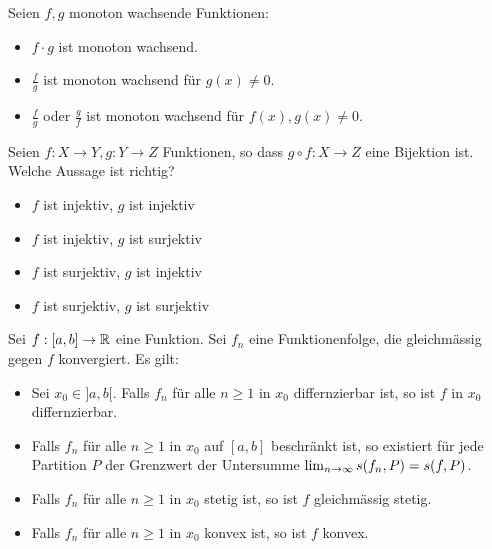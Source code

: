 Seien $f,g$ monoton wachsende Funktionen:
\begin{itemize}
    \item[$\square$]
    $f \cdot g$ ist monoton wachsend. 
    \item[$\square$]
    $\frac{f}{g}$ ist monoton wachsend für $g(x) \neq 0$.
    \item[$\square$]
    $\frac{f}{g}$ oder $\frac{g}{f}$ ist monoton wachsend für $f(x), g(x) \neq 0$.
\end{itemize}

Seien $f : X \to Y, g : Y \to Z$ Funktionen, so dass $g \circ f : X \to Z$ eine Bijektion ist. Welche
Aussage ist richtig?
\begin{itemize}
    \item[$\square$]
    $f$ ist injektiv, $g$ ist injektiv
    \item[\rlap{\raisebox{0.3ex}{\hspace{0.4ex}\tiny \ding{52}}}$\square$]
    $f$ ist injektiv, $g$ ist surjektiv
    \item[$\square$]
    $f$ ist surjektiv, $g$ ist injektiv
    \item[$\square$]
    $f$ ist surjektiv, $g$ ist surjektiv
\end{itemize}

Sei $f : [a,b] \to \mathbb{R}$ eine Funktion. Sei $f_n$ eine Funktionenfolge, die gleichmässig gegen $f$
konvergiert. Es gilt:
\begin{itemize}
    \item[$\square$]
    Sei $x_0 \in ]a,b[$. Falls $f_n$ für alle $n \geq 1$ in $x_0$ differnzierbar ist, so ist $f$ in 
    $x_0$ differnzierbar.
    \item[\rlap{\raisebox{0.3ex}{\hspace{0.4ex}\tiny \ding{52}}}$\square$]
    Falls $f_n$ für alle $n \geq 1$ in $x_0$ auf $[a,b]$ beschränkt ist, so existiert für jede Partition
    $P$ der Grenzwert der Untersumme $\lim_{n \rightarrow \infty} s(f_n, P) = s(f,P)$.
    \item[\rlap{\raisebox{0.3ex}{\hspace{0.4ex}\tiny \ding{52}}}$\square$]
    Falls $f_n$ für alle $n \geq 1$ in $x_0$ stetig ist, so ist $f$ gleichmässig stetig. 
    \item[\rlap{\raisebox{0.3ex}{\hspace{0.4ex}\tiny \ding{52}}}$\square$]
    Falls $f_n$ für alle $n \geq 1$ in $x_0$ konvex ist, so ist $f$ konvex.
\end{itemize}

